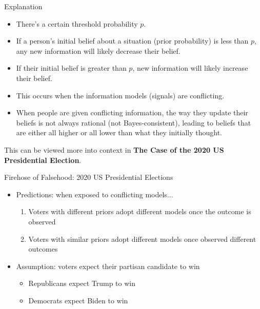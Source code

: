 \documentclass[aspectratio=169]{beamer}
\theoremstyle{definition}
\theoremstyle{plain}
\theoremstyle{plain}
\theoremstyle{definition}
\theoremstyle{plain}
\theoremstyle{plain}
\theoremstyle{plain}
\theoremstyle{plain}
\theoremstyle{remark}
\theoremstyle{definition}
\begin{document}
\begin{frame}{Explanation}
  \begin{itemize}
    \item There's a certain threshold probability $p$. 
    \item If a person's initial belief about a situation (prior probability) is less than $p$, any new information will likely decrease their belief.
    \item If their initial belief is greater than $p$, new information will likely increase their belief. 
    \item This occurs when the information models (signals) are conflicting.
    \item When people are given conflicting information, the way they update their beliefs is not always rational (not Bayes-consistent), leading to beliefs that are either all higher or all lower than what they initially thought.
  \end{itemize}
  \vspace{0.5cm}
  This can be viewed more into context in \textbf{The Case of the 2020 US Presidential Election}.
\end{frame}

\begin{frame}{Firehose of Falsehood: 2020 US Presidential Elections}
  \begin{itemize}
    \item Predictions: when exposed to conflicting models...
    \begin{enumerate}
      \item Voters with different priors adopt different models once the outcome is observed
      \item Voters with similar priors adopt different models once observed different outcomes
    \end{enumerate}
    \item Assumption: voters expect their partisan candidate to win
    \begin{itemize}
      \item Republicans expect Trump to win
      \item Democrats expect Biden to win
    \end{itemize}
  \end{itemize}
\end{frame}
\end{document}
